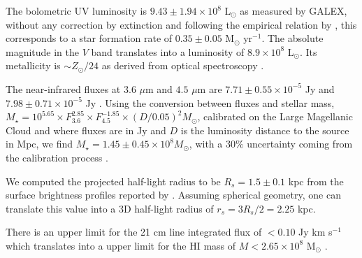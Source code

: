 \documentclass[a4,useAMS,usenatbib,usegraphicx]{mn2e}
\begin{document}
The bolometric UV luminosity is $9.43\pm1.94 \times 10^{8}$
L$_{\odot}$ as measured by GALEX, without any correction by extinction
and following the empirical relation by \cite{Kennicutt98}, this
corresponds to a star formation rate of $0.35\pm 0.05$ M$_{\odot}$
yr$^{-1}$. 
The absolute magnitude in the $V$ band translates into a luminosity of
$8.9\times 10^{8}$ L$_{\odot}$.  
Its metallicity is $\sim Z_{\odot}/24$ as derived from
optical spectroscopy \citep{Izotov04}. 
%

The near-infrared fluxes at $3.6$ $\mu$m and $4.5$ $\mu$m are
$7.71\pm0.55\times 10^{-5}$ Jy and $7.98\pm0.71\times 10^{-5}$ Jy
\citep{2008ApJ...678..804E}.
Using the conversion between fluxes and
stellar mass, $M_{\star} =
10^{5.65} \times F_{3.6}^{2.85} \times F_{4.5}^{-1.85} \times
(D/0.05)^2 M_{\odot}$,  calibrated on the Large Magellanic Cloud 
and  where fluxes are in Jy and $D$ is the luminosity
distance to the source in Mpc, we find $M_{\star} = 1.45\pm0.45\times 10^{8}
M_{\odot}$, with a $30\%$ uncertainty coming from the calibration
process \citep{2012AJ....143..139E}.  

We computed the projected half-light radius to be $R_s=1.5\pm0.1$ kpc 
from the surface brightness profiles reported by \cite{2003A&A...410..481N}. 
Assuming spherical geometry, one can translate this value into a 3D
half-light radius of $r_s=3R_s/2=2.25$ kpc.

There is an upper limit for the  21 cm line integrated flux of $<0.10$
Jy km s$^{-1}$  which translates into a upper limit for the HI mass of
$M<2.65\times 10^{8}$ M$_{\odot}$ \citep{pustilnikmartin07}.
\end{document}
